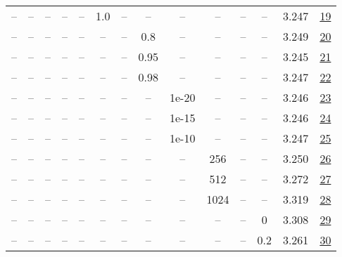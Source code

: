 \begin{table}[H]
\begin{tabular}{cccccccccccccc}
-- & -- & -- & -- & -- & 1.0 & -- & -- & -- & -- & -- & -- & 3.247 & \href{https://wandb.ai/stanford-mercury/optimizer-scaling/runs/sweep-130m-21B-scionb1c7630lr0.008-wd0.1-minlr0-warmup0-b10.98-g-2ba973}{19} \\
-- & -- & -- & -- & -- & -- & -- & 0.8 & -- & -- & -- & -- & 3.249 & \href{https://wandb.ai/stanford-mercury/optimizer-scaling/runs/sweep-130m-21B-sciontc26c48lr0.008-wd0.1-minlr0-warmup0-b10.98-g-7baa87}{20} \\
-- & -- & -- & -- & -- & -- & -- & 0.95 & -- & -- & -- & -- & 3.245 & \href{https://wandb.ai/stanford-mercury/optimizer-scaling/runs/sweep-130m-21B-sciono046318lr0.008-wd0.1-minlr0-warmup0-b10.98-g-682eb4}{21} \\
-- & -- & -- & -- & -- & -- & -- & 0.98 & -- & -- & -- & -- & 3.247 & \href{https://wandb.ai/stanford-mercury/optimizer-scaling/runs/sweep-130m-21B-sciono44ab05lr0.008-wd0.1-minlr0-warmup0-b10.98-g-665c33}{22} \\
-- & -- & -- & -- & -- & -- & -- & -- & 1e-20 & -- & -- & -- & 3.246 & \href{https://wandb.ai/stanford-mercury/optimizer-scaling/runs/sweep-130m-21B-scionecd5b4lr0.008-wd0.1-minlr0-warmup0-b10.98-gn-92c4e5}{23} \\
-- & -- & -- & -- & -- & -- & -- & -- & 1e-15 & -- & -- & -- & 3.246 & \href{https://wandb.ai/stanford-mercury/optimizer-scaling/runs/sweep-130m-21B-scionk08138alr0.008-wd0.1-minlr0-warmup0-b10.98-g-278e54}{24} \\
-- & -- & -- & -- & -- & -- & -- & -- & 1e-10 & -- & -- & -- & 3.247 & \href{https://wandb.ai/stanford-mercury/optimizer-scaling/runs/sweep-130m-21B-scion5d7828lr0.008-wd0.1-minlr0-warmup0-b10.98-gn-94d764}{25} \\
-- & -- & -- & -- & -- & -- & -- & -- & -- & 256 & -- & -- & 3.250 & \href{https://wandb.ai/stanford-mercury/optimizer-scaling/runs/sweep-130m-21B-scion8d67e8lr0.008-wd0.1-minlr0-warmup0-b10.98-gn-fab0cb}{26} \\
-- & -- & -- & -- & -- & -- & -- & -- & -- & 512 & -- & -- & 3.272 & \href{https://wandb.ai/stanford-mercury/optimizer-scaling/runs/sweep-130m-21B-scion1842ealr0.008-wd0.1-minlr0-warmup0-b10.98-gn-7b77d6}{27} \\
-- & -- & -- & -- & -- & -- & -- & -- & -- & 1024 & -- & -- & 3.319 & \href{https://wandb.ai/stanford-mercury/optimizer-scaling/runs/sweep-130m-21B-sciono9fdb98lr0.008-wd0.1-minlr0-warmup0-b10.98-g-5de496}{28} \\
-- & -- & -- & -- & -- & -- & -- & -- & -- & -- & -- & 0 & 3.308 & \href{https://wandb.ai/stanford-mercury/optimizer-scaling/runs/sweep-130m-21B-scionbc1373elr0.008-wd0-minlr0-warmup0-b10.98-gn2-5e6a7c}{29} \\
-- & -- & -- & -- & -- & -- & -- & -- & -- & -- & -- & 0.2 & 3.261 & \href{https://wandb.ai/stanford-mercury/optimizer-scaling/runs/sweep-130m-21B-scion898306lr0.008-wd0.2-minlr0-warmup0-b10.98-gn-a11a2b}{30} \\
\bottomrule
\end{tabular}
\end{table}

